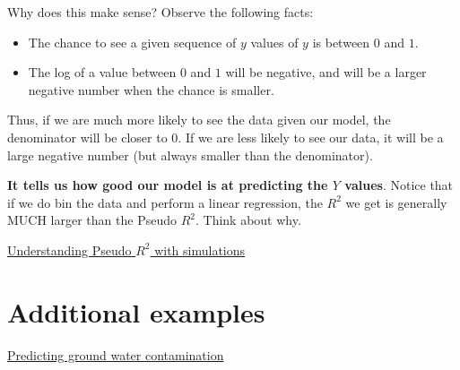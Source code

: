 Why does this make sense? Observe the following facts:
\begin{itemize}
\item  The chance to see a given sequence of $y$ values of $y$ is between $0$ and $1$. 
\item  The log of a value between $0$ and $1$ will be negative, and will be a larger negative number when the chance is smaller. 
\end{itemize}
Thus, if we are much more likely to see the data given our model, the denominator will be closer to $0$. If we are less likely to see our data, it will be a large negative number (but always smaller than the denominator). 

{\bf It tells us how good our model is at predicting the $Y$ values}. Notice that if we do bin the data and perform a linear regression, the $R^2$ we get is generally MUCH larger than the Pseudo $R^2$. Think about why. 

\begin{example}
\href{https://colab.research.google.com/drive/1_oMrxtIlJ-EdW1ozmlydx0A9qrA-sVKm#scrollTo=HEfVl_PA2OCE&line=1&uniqifier=1}{Understanding Pseudo $R^2$ with simulations}
\end{example}


%

\section{Additional examples}
\begin{example}
\href{https://colab.research.google.com/drive/1_oMrxtIlJ-EdW1ozmlydx0A9qrA-sVKm#scrollTo=HEfVl_PA2OCE&line=1&uniqifier=1}{Predicting ground water contamination }
\end{example}


